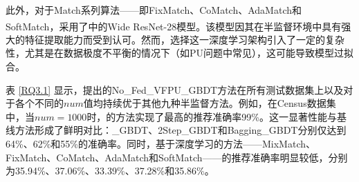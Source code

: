 此外，对于Match系列算法——即FixMatch、CoMatch、AdaMatch和SoftMatch，采用了\textsuperscript{\cite{oliver2018realistic}}中的Wide ResNet-28模型。该模型因其在半监督环境中具有强大的特征提取能力而受到认可。然而，选择这一深度学习架构引入了一定的复杂性，尤其是在数据极度不平衡的情况下（如PU问题中常见），这可能导致模型过拟合。

表 \ref{RQ3.1} 显示，提出的No\_Fed\_VFPU\_GBDT方法在所有测试数据集上以及对于各个不同的$num$值均持续优于其他九种半监督方法。例如，在Census数据集中，当$num=1000$时，的方法实现了最高的推荐准确率99\%。这一显著性能与基线方法形成了鲜明对比：\_GBDT、2Step\_GBDT和Bagging\_GBDT分别仅达到64\%、62\%和55\%的准确率。同时，基于深度学习的方法——MixMatch、FixMatch、CoMatch、AdaMatch和SoftMatch——的推荐准确率明显较低，分别为35.94\%、37.06\%、33.39\%、37.28\%和35.86\%。

\vspace{0.1cm}
